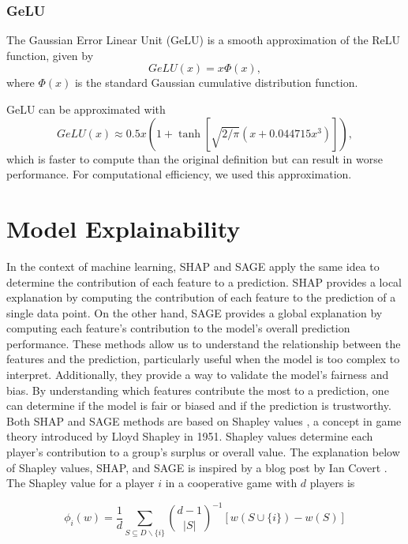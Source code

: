 \subsubsection{GeLU}
The Gaussian Error Linear Unit (GeLU) is a smooth approximation of the ReLU function, given by
\begin{equation}
    GeLU(x) = x \Phi (x),
\end{equation}
where $\Phi(x)$ is the standard Gaussian cumulative distribution function.

GeLU can be approximated with
\begin{equation}
    GeLU(x) \approx 0.5x \left( 1+\tanh\left[\sqrt{2/\pi}(x+0.044715x^3)\right] \right),
\end{equation}
which is faster to compute than the original definition but can result in worse performance.
For computational efficiency, we used this approximation.


\section{Model Explainability}
In the context of machine learning, SHAP \cite{SHAP} and SAGE \cite{SAGE} apply the same idea to determine the contribution of each feature to a prediction.
SHAP provides a local explanation by computing the contribution of each feature to the prediction of a single data point.
On the other hand, SAGE provides a global explanation by computing each feature's contribution to the model's overall prediction performance.
These methods allow us to understand the relationship between the features and the prediction, particularly useful when the model is too complex to interpret.
Additionally, they provide a way to validate the model's fairness and bias.
By understanding which features contribute the most to a prediction, one can determine if the model is fair or biased and if the prediction is trustworthy.\\

Both SHAP and SAGE methods are based on Shapley values \cite{shapley_value_1953}, a concept in game theory introduced by Lloyd Shapley in 1951.
Shapley values determine each player's contribution to a group's surplus or overall value.
The explanation below of Shapley values, SHAP, and SAGE is inspired by a blog post by Ian Covert \cite{covert_shap_sage}.\\

The Shapley value for a player $i$ in a cooperative game with $d$ players is

\begin{equation}
    \phi_i(w) = \frac{1}{d} \sum_{S \subseteq D \backslash \{ i \} } \binom{d-1}{|S|}^{-1} \left[ w(S\cup \{ i \} ) - w(S) \right]
\end{equation}

